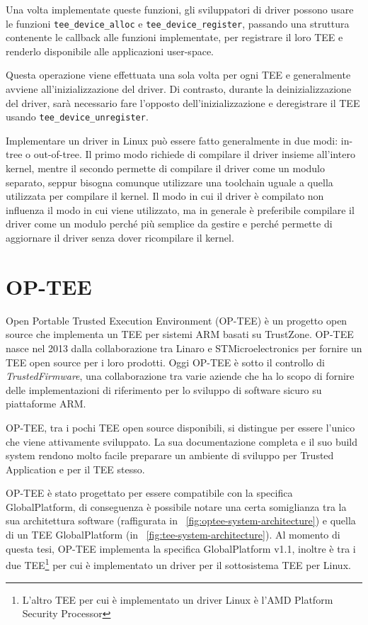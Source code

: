 \documentclass[12pt,italian]{report}
\begin{document}
Una volta implementate queste funzioni, gli sviluppatori di driver
possono usare le funzioni \texttt{tee\_device\_alloc} e
\texttt{tee\_device\_register}, passando una struttura contenente
le callback alle funzioni implementate, per registrare il loro TEE
e renderlo disponibile alle applicazioni user-space.

Questa operazione viene effettuata una sola volta per ogni TEE e
generalmente avviene all'inizializzazione del driver.
Di contrasto, durante la deinizializzazione del driver, sarà necessario
fare l'opposto dell'inizializzazione e deregistrare il TEE usando
\texttt{tee\_device\_unregister}.

\bigbreak \noindent

Implementare un driver in Linux può essere fatto generalmente in due modi:
in-tree o out-of-tree. Il primo modo richiede di compilare il driver insieme
all'intero kernel, mentre il secondo permette di compilare il driver come un
modulo separato, seppur bisogna comunque utilizzare una toolchain uguale a
quella utilizzata per compilare il kernel.
Il modo in cui il driver è compilato non influenza il modo in cui viene
utilizzato, ma in generale è preferibile compilare il driver come un modulo
perché più semplice da gestire e perché permette di aggiornare il driver
senza dover ricompilare il kernel.

\section{OP-TEE}
\label{sec:architettura-op-tee}
Open Portable Trusted Execution Environment (OP-TEE)\cite{optee}
è un progetto open source
che implementa un TEE per sistemi ARM basati su TrustZone.
OP-TEE nasce nel 2013 dalla collaborazione tra Linaro e STMicroelectronics
per fornire un TEE open source per i loro prodotti.
Oggi OP-TEE è sotto il controllo di \textit{TrustedFirmware}, una
collaborazione tra varie aziende che ha lo scopo di fornire delle
implementazioni di riferimento per lo sviluppo di software sicuro
su piattaforme ARM.

OP-TEE, tra i pochi TEE open source disponibili, si distingue per
essere l'unico che viene attivamente sviluppato.
La sua documentazione completa e il suo build system rendono molto facile
preparare un ambiente di sviluppo per Trusted Application e
per il TEE stesso.

OP-TEE è stato progettato per essere compatibile con la specifica
GlobalPlatform, di conseguenza è possibile notare una certa somiglianza
tra la sua architettura software (raffigurata in
\figurename~\ref{fig:optee-system-architecture})
e quella di un TEE GlobalPlatform
(in \figurename~\ref{fig:tee-system-architecture}).
Al momento di questa tesi, OP-TEE implementa la specifica GlobalPlatform v1.1,
inoltre è tra i due TEE\footnote{
        L'altro TEE per cui è implementato un driver Linux è
        l'AMD Platform Security Processor
} per cui è implementato un driver per il sottosistema TEE per Linux.
\end{document}
